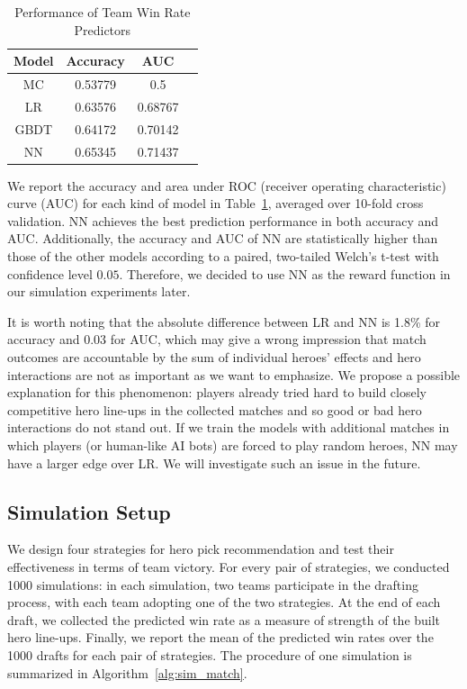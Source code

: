 \begin{table}
  \caption{Performance of Team Win Rate Predictors}
  \centering
  \label{tab:auc}
  \begin{tabular}{c@{\hskip 0.5in}c@{\hskip 0.36in}c@{\hskip 0.36in}c}
    \toprule
    Model  & Accuracy & AUC  \\
    \midrule
    MC   & 0.53779        & 0.5       \\
    LR   & 0.63576        & 0.68767    \\
    GBDT & 0.64172        & 0.70142   \\
	NN   & 0.65345        & 0.71437  \\
  \bottomrule
\end{tabular}
\end{table}


We report the accuracy and area under ROC (receiver operating characteristic) curve (AUC) for each kind of model in Table~\ref{tab:auc}, averaged over 10-fold cross validation. NN achieves the best prediction performance in both accuracy and AUC. Additionally, the accuracy and AUC of NN are statistically higher than those of the other models according to a paired, two-tailed Welch's t-test with confidence level $0.05$. Therefore, we decided to use NN as the reward function in our simulation experiments later. 


It is worth noting that the absolute difference between LR and NN is 1.8\% for accuracy and 0.03 for AUC, which may give a wrong impression that match outcomes are accountable by the sum of individual heroes' effects and hero interactions are not as important as we want to emphasize. We propose a possible explanation for this phenomenon: players already tried hard to build closely competitive hero line-ups in the collected matches and so good or bad hero interactions do not stand out. If we train the models with additional matches in which players (or human-like AI bots) are forced to play random heroes, NN may have a larger edge over LR. We will investigate such an issue in the future.




\subsection{Simulation Setup}
We design four strategies for hero pick recommendation and test their effectiveness in terms of team victory. For every pair of strategies, we conducted 1000 simulations: in each simulation, two teams participate in the drafting process, with each team adopting one of the two strategies. At the end of each draft, we collected the predicted win rate as a measure of strength of the built hero line-ups. Finally, we report the mean of the predicted win rates over the 1000 drafts for each pair of strategies. The procedure of one simulation is summarized in Algorithm~\ref{alg:sim_match}.

